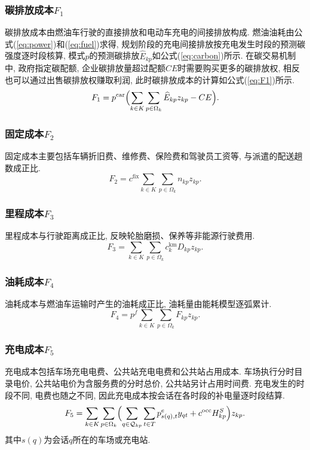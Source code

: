\documentclass{setp-new}
\begin{document}
\subsubsection{碳排放成本\texorpdfstring{$F_1$}{F1}}
碳排放成本由燃油车行驶的直接排放和电动车充电的间接排放构成.
燃油油耗由公式(\ref{eq:power})和(\ref{eq:fuel})求得,
规划阶段的充电间接排放按充电发生时段的预测碳强度逐时段核算,
模式$p$的预测碳排放$\widehat E_{kp}$如公式(\ref{eq:carbon})所示.
在碳交易机制中, 政府指定碳配额,
企业碳排放量超过配额$CE$时需要购买更多的碳排放权,
相反也可以通过出售碳排放权赚取利润, 此时碳排放成本的计算如公式(\ref{eq:F1})所示.
\begin{equation}
F_1=p^{\mathrm{car}}\Bigl(\sum_{k\in K}\sum_{p\in\Omega_k}\widehat E_{kp}z_{kp}-CE\Bigr).
\label{eq:F1}
\end{equation}

\subsubsection{固定成本\texorpdfstring{$F_2$}{F2}}
固定成本主要包括车辆折旧费、维修费、保险费和驾驶员工资等, 与派遣的配送趟数成正比.
\begin{equation}
F_2=c^{\mathrm{fix}}\sum_{k\in K}\sum_{p\in\Omega_k}n_{kp}z_{kp}.
\label{eq:F2}
\end{equation}

\subsubsection{里程成本\texorpdfstring{$F_3$}{F3}}
里程成本与行驶距离成正比, 反映轮胎磨损、保养等非能源行驶费用.
\begin{equation}
F_3=\sum_{k\in K}\sum_{p\in\Omega_k}c_k^{\mathrm{km}}D_{kp}z_{kp}.
\label{eq:F3}
\end{equation}

\subsubsection{油耗成本\texorpdfstring{$F_4$}{F4}}
油耗成本与燃油车运输时产生的油耗成正比, 油耗量由能耗模型逐弧累计.
\begin{equation}
F_4=p^f\sum_{k\in K}\sum_{p\in\Omega_k}F_{kp}z_{kp}.
\label{eq:F4}
\end{equation}

\subsubsection{充电成本\texorpdfstring{$F_5$}{F5}}
充电成本包括车场充电电费、公共站充电电费和公共站占用成本.
车场执行分时目录电价, 公共站电价为含服务费的分时总价, 公共站另计占用时间费.
充电发生的时段不同, 电费也随之不同, 因此充电成本按会话在各时段的补电量逐时段结算.
\begin{equation}
F_5=\sum_{k\in K}\sum_{p\in\Omega_k}\Bigl(\sum_{q\in\mathcal Q_{kp}}\sum_{t\in T}p_{s(q),t}^{e}y_{qt}
+c^{\mathrm{occ}}H_{kp}^{S}\Bigr)z_{kp}.
\label{eq:F5}
\end{equation}
其中$s(q)$为会话$q$所在的车场或充电站.
\end{document}
